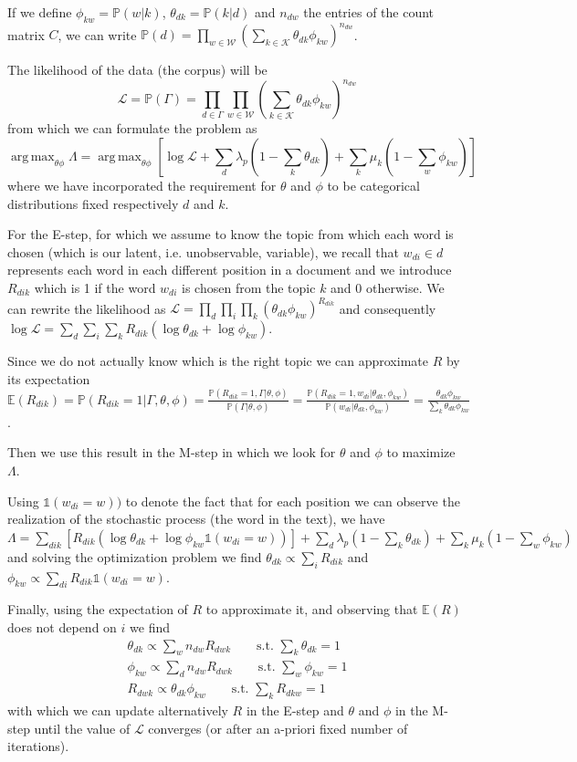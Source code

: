 \documentclass[11pt, a4paper, oneside, openright]{book}
\DeclareMathOperator*{\argmax}{arg\,max}
\begin{document}
If we define $\phi_{kw} = \mathbb{P}(w|k)$, $\theta_{dk} = \mathbb{P}(k|d)$ and $n_{dw}$ the entries of the count matrix $C$, we can write $\mathbb{P}(d) = \prod_{w\in \mathcal{W}} (\sum_{k \in \mathcal{K}}\theta_{dk}\phi_{kw})^{n_{dw}}$.

The likelihood of the data (the corpus) will be 
$$\mathcal{L} = \mathbb{P}(\Gamma) = \prod_{d \in \Gamma}\prod_{w\in \mathcal{W}} (\sum_{k \in \mathcal{K}}\theta_{dk}\phi_{kw})^{n_{dw}}$$
from which we can formulate the problem as
$$\argmax_{\theta \phi} \Lambda = \argmax_{\theta \phi} \left[\log\mathcal{L} + \sum_d \lambda_p(1-\sum_k \theta_{dk}) + \sum_k \mu_k (1-\sum_w \phi_{kw})\right]$$
where we have incorporated the requirement for $\theta$ and $\phi$ to be categorical distributions fixed respectively $d$ and $k$.

For the E-step, for which we assume to know the topic from which each word is chosen (which is our latent, i.e. unobservable, variable), we recall that $w_{di} \in d$ represents each word in each different position in a document and we introduce $R_{dik}$ which is 1 if the word $w_{di}$ is chosen from the topic $k$ and 0 otherwise. 
We can rewrite the likelihood as $\mathcal{L} = \prod_d \prod_i \prod_k (\theta_{dk}\phi_{kw})^{R_{dik}}$ and consequently $\log\mathcal{L} = \sum_d \sum_i \sum_k R_{dik} (\log\theta_{dk} + \log\phi_{kw})$.

Since we do not actually know which is the right topic we can approximate $R$ by its expectation $\mathbb{E}(R_{dik}) = \mathbb{P}(R_{dik} = 1 | \Gamma, \theta, \phi) = \frac{\mathbb{P}(R_{dik} = 1, \Gamma | \theta, \phi)}{\mathbb{P}(\Gamma | \theta, \phi)} = \frac{\mathbb{P}(R_{dik} = 1, w_{di} | \theta_{dk}, \phi_{kw})}{\mathbb{P}(w_{di} | \theta_{dk}, \phi_{kw})} = \frac{\theta_{dk} \phi_{kw}}{\sum_k \theta_{dk} \phi_{kw}}$.

Then we use this result in the M-step in which we look for $\theta$ and $\phi$ to maximize $\Lambda$.

Using $\mathbb{1}(w_{di} = w))$ to denote the fact that for each position we can observe the realization of the stochastic process (the word in the text), we have
$\Lambda = \sum_{dik} \left[R_{dik} (\log \theta_{dk} + \log \phi_{kw} \mathbb{1}(w_{di} = w))\right] + \sum_d \lambda_p(1-\sum_k \theta_{dk}) + \sum_k \mu_k (1-\sum_w \phi_{kw})$ and solving the optimization problem we find $\theta_{dk} \propto {\sum_i R_{dik}}$ and $\phi_{kw} \propto \sum_{di} R_{dik} \mathbb{1}(w_{di} = w)$.

Finally, using the expectation of $R$ to approximate it, and observing that $\mathbb{E}(R)$ does not depend on $i$ we find
\begin{align*}
		\theta_{dk} \propto {\sum_w n_{dw} R_{dwk}} \qquad \text{s.t. $\sum_k \theta_{dk} = 1$}\\
		\phi_{kw} \propto \sum_{d} n_{dw} R_{dwk} \qquad \text{s.t. $\sum_w \phi_{kw} = 1$}\\
		R_{dwk} \propto \theta_{dk} \phi_{kw} \qquad \text{s.t. $\sum_k R_{dkw} = 1$}      
\end{align*}
with which we can update alternatively $R$ in the E-step and $\theta$ and $\phi$ in the M-step until the value of $\mathcal{L}$ converges (or after an a-priori fixed number of iterations).
\end{document}
